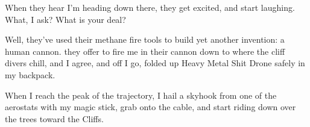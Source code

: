 When they hear I'm heading down there, they get excited, and start
laughing. What, I ask? What is your deal?

Well, they've used their methane fire tools to build yet another
invention: a human cannon. they offer to fire me in their cannon down to
where the cliff divers chill, and I agree, and off I go, folded up Heavy
Metal Shit Drone safely in my backpack.

When I reach the peak of the trajectory, I hail a skyhook from one of
the aerostats with my magic stick, grab onto the cable, and start riding
down over the trees toward the Cliffs.
